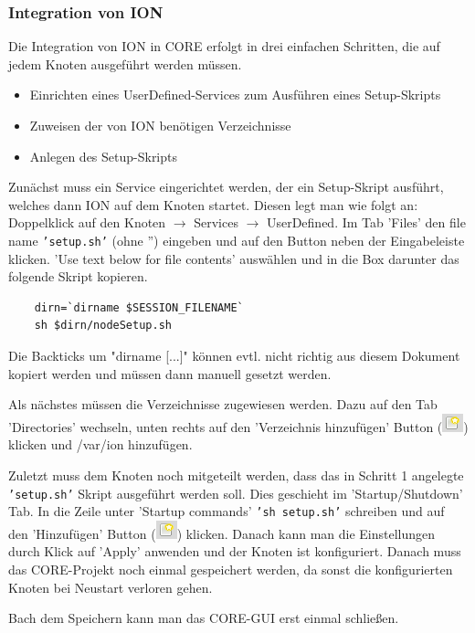 \documentclass{article}
\begin{document}
\subsubsection{Integration von ION}
Die Integration von ION in CORE erfolgt in drei einfachen Schritten, die auf jedem Knoten ausgeführt werden müssen.
\begin{itemize}
\item Einrichten eines UserDefined-Services zum Ausführen eines Setup-Skripts
\item Zuweisen der von ION benötigen Verzeichnisse
\item Anlegen des Setup-Skripts
\end{itemize}\par
Zunächst muss ein Service eingerichtet werden, der ein Setup-Skript ausführt, welches dann ION auf dem Knoten startet. Diesen legt man wie folgt an: Doppelklick auf den Knoten $\rightarrow$ Services $\rightarrow$ UserDefined. Im Tab 'Files' den file name \texttt{'setup.sh'} (ohne '') eingeben und auf den Button neben der Eingabeleiste klicken. 'Use text below for file contents' auswählen und in die Box darunter das folgende Skript kopieren.
\begin{verbatim}
    dirn=`dirname $SESSION_FILENAME`
    sh $dirn/nodeSetup.sh
\end{verbatim}
Die Backticks um "dirname [...]" können evtl. nicht richtig aus diesem Dokument kopiert werden und müssen dann manuell gesetzt werden.\par
Als nächstes müssen die Verzeichnisse zugewiesen werden. Dazu auf den Tab 'Directories' wechseln, unten rechts auf den 'Verzeichnis hinzufügen' Button (\includegraphics[height=\fontcharht\font`\B]{new}) klicken und /var/ion hinzufügen.\par
Zuletzt muss dem Knoten noch mitgeteilt werden, dass das in Schritt 1 angelegte \texttt{'setup.sh'} Skript ausgeführt werden soll. Dies geschieht im 'Startup/Shutdown' Tab. In die Zeile unter 'Startup commands' \texttt{'sh setup.sh'} schreiben und auf den 'Hinzufügen' Button (\includegraphics[height=\fontcharht\font`\B]{new}) klicken. Danach kann man die Einstellungen durch Klick auf 'Apply' anwenden und der Knoten ist konfiguriert. Danach muss das CORE-Projekt noch einmal gespeichert werden, da sonst die konfigurierten Knoten bei Neustart verloren gehen.\par
Bach dem Speichern kann man das CORE-GUI erst einmal schließen.
\end{document}
